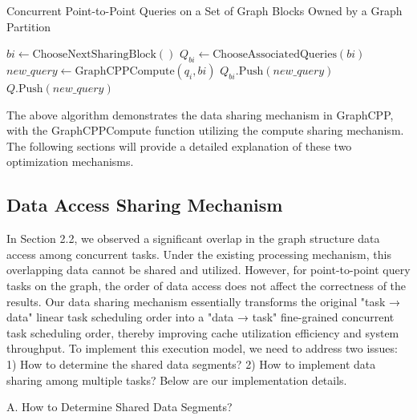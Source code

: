 \documentclass[lettersize,journal]{IEEEtran} %
\begin{document}
\begin{algorithm}
  \caption{Concurrent Point-to-Point Queries on a Set of Graph Blocks Owned by a Graph Partition}
  \label{algorithm:concurrent-queries}
  \begin{algorithmic}[1]
   
          \State $bi \gets \text{ChooseNextSharingBlock}()$
          \State $Q_{bi} \gets \text{ChooseAssociatedQueries}(bi)$
           
              \State $new\_query \gets \text{GraphCPPCompute}(q_i, bi)$ 
                  \State $Q_{bi}.\text{Push}(new\_query)$
              \Else
                  \State $Q.\text{Push}(new\_query)$
              \EndIf
          \EndFor
      \EndWhile
  \EndProcedure
  \end{algorithmic}
  \end{algorithm}
  
The above algorithm demonstrates the data sharing mechanism in GraphCPP, with the GraphCPPCompute function utilizing the compute sharing mechanism. The following sections will provide a detailed explanation of these two optimization mechanisms.  

\subsection{Data Access Sharing Mechanism}
In Section 2.2, we observed a significant overlap in the graph structure data access among concurrent tasks. Under the existing processing mechanism, this overlapping data cannot be shared and utilized. However, for point-to-point query tasks on the graph, the order of data access does not affect the correctness of the results. Our data sharing mechanism essentially transforms the original "task → data" linear task scheduling order into a "data → task" fine-grained concurrent task scheduling order, thereby improving cache utilization efficiency and system throughput. To implement this execution model, we need to address two issues: 1) How to determine the shared data segments? 2) How to implement data sharing among multiple tasks? Below are our implementation details.

A. How to Determine Shared Data Segments?
\end{document}
